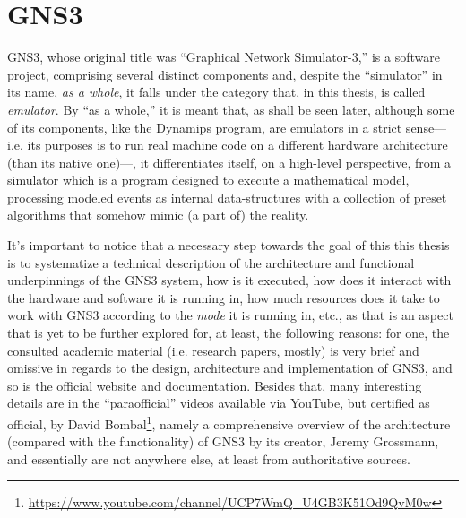 
\chapter{GNS3}
\label{ch:gns3}

GNS3, whose original title was ``Graphical Network Simulator-3,'' is a software project, comprising several distinct components and, despite the ``simulator'' in its name, \emph{as a whole}, it falls under the category that, in this thesis, is called \emph{emulator}. %
By ``as a whole,'' it is meant that, as shall be seen later, although some of its components, like the Dynamips program, are emulators in a strict sense---i.e. its purposes is to run real machine code on a different hardware architecture (than its native one)---, it differentiates itself, on a high-level perspective, from a simulator which is a program designed to execute a mathematical model, processing modeled events as internal data-structures with a collection of preset algorithms that somehow mimic (a part of) the reality.

It's important to notice that a necessary step towards the goal of this this thesis is to systematize a technical description of the architecture and functional underpinnings of the GNS3 system, how is it executed, how does it interact with the hardware and software it is running in, how much resources does it take to work with GNS3 according to the \emph{mode} it is running in, etc., as that is an aspect that is yet to be further explored for, at least, the following reasons:  %
for one, the consulted academic material (i.e. research papers, mostly) is very brief and omissive in regards to the design, architecture and implementation of GNS3, and so is the official website and documentation. Besides that, many interesting details are in the ``paraofficial'' videos available via YouTube, but certified as official, by David Bombal\footnote{\url{https://www.youtube.com/channel/UCP7WmQ_U4GB3K51Od9QvM0w}}, namely a comprehensive overview of the architecture (compared with the functionality) of GNS3 by its creator, Jeremy Grossmann, and essentially are not anywhere else, at least from authoritative sources. %


